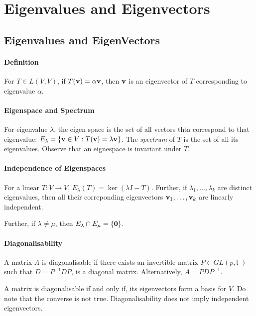 \section{Eigenvalues and Eigenvectors}

\subsection{Eigenvalues and EigenVectors}

\paragraph{Definition}
For \( T \in L(V, V) \), if \( T(\mathbf{v}) = \alpha \mathbf{v} \), then
\( \mathbf{v} \) is an eigenvector of \( T \) corresponding to eigenvalue
\( \alpha \).

\paragraph{Eigenspace and Spectrum}
For eigenvalue \( \lambda \), the eigen space is the set
of all vectors thta correspond to that eigenvalue:
\( E_\lambda = \left\{ \mathbf{v} \in V : T(\mathbf{v}) = \lambda \mathbf{v} \right\} \).
The \textit{spectrum} of \( T \) is the set of all its
eigenvalues.
Observe that an eignespace is invariant under \( T \).

\paragraph{Independence of Eigenspaces}
For a linear \( T: V \to V \), \( E_\lambda(T) = \ker(\lambda I - T) \).
Further, if \( \lambda_1,\dots,\lambda_k \) are distinct eigenvalues,
then all their correponding eigenvectors \( \mathbf{v}_1, \dots, \mathbf{v}_k \)
are linearly independent.

Further, if \( \lambda \neq \mu \), then \( E_\lambda \cap E_\mu = \left\{ \mathbf{0} \right\} \).

\paragraph{Diagonalisability}
A matrix \( A \) is diagonalisable if there exists an invertible matrix
\( P \in GL(p, \mathbb{F}) \) such that \( D = P^{-1} D P \),
is a diagonal matrix. Alternatively, \( A = P D P^{-1} \).

A matrix is diagonalisable if and only if, its eigenvectors form a basis
for \( V \). Do note that the converse is not true. Diagonalisability
does not imply independent eigenvectors.


